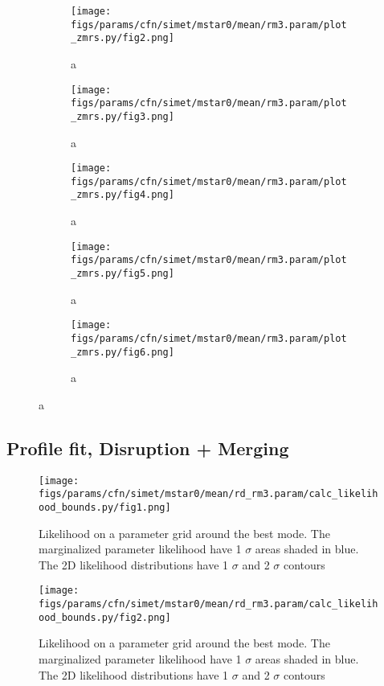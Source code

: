\documentclass[twocolumn]{article}
\begin{document}
\begin{figure}
  \begin{subfigure}{.5\textwidth}
    \centering\texttt{[image: figs/params/cfn/simet/mstar0/mean/rm3.param/plot\_zmrs.py/fig2.png]}
    \caption{a}
  \end{subfigure}
  \begin{subfigure}{.5\textwidth}
    \centering\texttt{[image: figs/params/cfn/simet/mstar0/mean/rm3.param/plot\_zmrs.py/fig3.png]}
    \caption{a}
  \end{subfigure}
  \begin{subfigure}{.5\textwidth}
    \centering\texttt{[image: figs/params/cfn/simet/mstar0/mean/rm3.param/plot\_zmrs.py/fig4.png]}
    \caption{a}
  \end{subfigure}%
  \begin{subfigure}{.5\textwidth}
    \centering\texttt{[image: figs/params/cfn/simet/mstar0/mean/rm3.param/plot\_zmrs.py/fig5.png]}
    \caption{a}
  \end{subfigure}
  \begin{subfigure}{.5\textwidth}
    \centering\texttt{[image: figs/params/cfn/simet/mstar0/mean/rm3.param/plot\_zmrs.py/fig6.png]}
    \caption{a}
  \end{subfigure}
  
\end{figure}
\clearpage


\subsection{Profile fit, Disruption + Merging}
\begin{figure}[H]
  \center\texttt{[image: figs/params/cfn/simet/mstar0/mean/rd\_rm3.param/calc\_likelihood\_bounds.py/fig1.png]}
  \caption{Likelihood on a parameter grid around the best mode. The marginalized parameter likelihood have
    1 $\sigma$ areas shaded in blue. The 2D likelihood distributions have 1 $\sigma$  and 2 $\sigma$ contours}
  \label{fig:basic_rd:likelihood}
\end{figure}

\begin{figure}[H]
  \center\texttt{[image: figs/params/cfn/simet/mstar0/mean/rd\_rm3.param/calc\_likelihood\_bounds.py/fig2.png]}
  \caption{Likelihood on a parameter grid around the best mode. The marginalized parameter likelihood have
    1 $\sigma$ areas shaded in blue. The 2D likelihood distributions have 1 $\sigma$  and 2 $\sigma$ contours}
  \label{fig:basic_rd:likelihood}
\end{figure}
\end{document}
